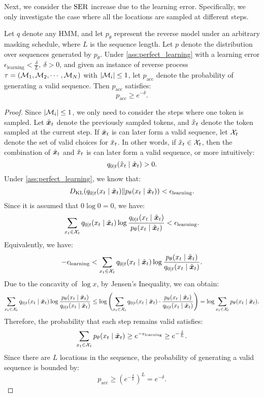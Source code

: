 Next, we consider the $\operatorname{SER}$ increase due to the learning error. Specifically, we only investigate the case where all the locations are sampled at different steps.

\begin{lemma}
\label{lemma:acc_gen}
    Let $q$ denote any HMM, and let $p_\mathsf{\theta}$ represent the reverse model under an arbitrary masking schedule, where $L$ is the sequence length. Let $p$ denote the distribution over sequences generated by $p_\mathsf{\theta}$. Under \cref{ass:perfect_learning} with a learning error $\epsilon_\text{learning} < \frac{\delta}{L},\ \delta>0$, and given an instance of reverse process $\tau=({\mathcal{M}}_1,{\mathcal{M}}_2,\cdots,{\mathcal{M}}_N)$ with $|{\mathcal{M}}_i|\leq 1$, let $p_\mathrm{acc}$ denote the probability of generating a valid sequence. Then $p_\mathrm{acc}$ satisfies:
    $$p_\mathrm{acc}\geq e^{-\delta}.$$
\end{lemma}

\begin{proof}
    Since $|{\mathcal{M}}_i|\leq 1$, we only need to consider the steps where one token is sampled. Let $\Tilde{{\bm{x}}}_t$ denote the previously sampled tokens, and $\Tilde{x}_t$ denote the token sampled at the current step. If $\Tilde{{\bm{x}}}_t$ is can later form a valid sequence, let ${\mathcal{X}}_t$ denote the set of valid choices for $\Tilde{x}_t$. In other words, if $\Tilde{x}_t\in {\mathcal{X}}_t$, then the combination of $\Tilde{{\bm{x}}}_t$ and $\Tilde{x}_t$ is can later form a valid sequence, or more intuitively:
    $$q_{0|t}(\Tilde{x}_t\mid\Tilde{{\bm{x}}}_t)>0.$$
    Under \cref{ass:perfect_learning}, we know that:
    $$D_{\mathrm{KL}}(q_{0|t}(x_t \mid \Tilde{{\bm{x}}}_t)\|p_\mathbf{\theta}(x_t \mid \Tilde{{\bm{x}}}_t)) < \epsilon_\text{learning}.$$
    Since it is assumed that $0\log 0=0$, we have:
    $$\sum_{x_t\in{\mathcal{X}}_t}q_{0|t}(x_t \mid \Tilde{{\bm{x}}}_t)\log\frac{q_{0|t}(x_t \mid \Tilde{{\bm{x}}}_t)}{p_\theta(x_t \mid \Tilde{{\bm{x}}}_t)}<{\epsilon}_\text{learning}.$$
    Equivalently, we have:
    $$-{\epsilon}_\text{learning}<\sum_{x_t\in{\mathcal{X}}_t}q_{0|t}(x_t \mid \Tilde{{\bm{x}}}_t)\log\frac{p_\theta(x_t \mid \Tilde{{\bm{x}}}_t)}{q_{0|t}(x_t \mid \Tilde{{\bm{x}}}_t)}.$$
    Due to the concavity of $\log x$, by Jensen's Inequality, we can obtain:
    $$\sum_{x_t\in{\mathcal{X}}_t}q_{0|t}(x_t \mid \Tilde{{\bm{x}}}_t)\log\frac{p_\theta(x_t \mid \Tilde{{\bm{x}}}_t)}{q_{0|t}(x_t \mid \Tilde{{\bm{x}}}_t)}\leq \log\left(\sum_{x_t\in{\mathcal{X}}_t}q_{0|t}(x_t \mid \Tilde{{\bm{x}}}_t)\cdot \frac{p_\theta(x_t \mid \Tilde{{\bm{x}}}_t)}{q_{0|t}(x_t \mid \Tilde{{\bm{x}}}_t)}\right) =\log\sum_{x_t\in{\mathcal{X}}_t}p_\theta(x_t \mid \Tilde{{\bm{x}}}_t).$$
    Therefore, the probability that each step remains valid satisfies:
    $$\sum_{x_t\in{\mathcal{X}}_t}p_\theta(x_t \mid \Tilde{{\bm{x}}}_t)\geq e^{-{\epsilon}_\text{learning}}\geq e^{-\frac{\delta}{L}}.$$
    Since there are $L$ locations in the sequence, the probability of generating a valid sequence is bounded by:
    $$p_\mathrm{acc}\geq (e^{-\frac{\delta}{L}})^L=e^{-\delta}.$$
\end{proof}

